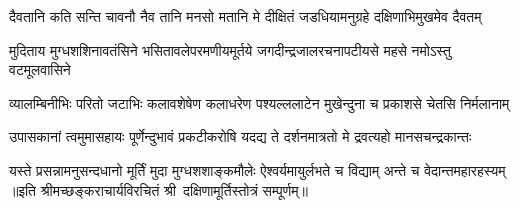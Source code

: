 \fourlineindentedshloka
{दैवतानि कति सन्ति चावनौ}
{नैव तानि मनसो मतानि मे}
{दीक्षितं जडधियामनुग्रहे}
{दक्षिणाभिमुखमेव दैवतम्}

\fourlineindentedshloka
{मुदिताय मुग्धशशिनावतंसिने}
{भसितावलेपरमणीयमूर्तये}
{जगदीन्द्रजालरचनापटीयसे}
{महसे नमोऽस्तु वटमूलवासिने}

\fourlineindentedshloka
{व्यालम्बिनीभिः परितो जटाभिः}
{कलावशेषेण कलाधरेण}
{पश्यल्ललाटेन मुखेन्दुना च}
{प्रकाशसे चेतसि निर्मलानाम्}

\fourlineindentedshloka
{उपासकानां त्वमुमासहायः}
{पूर्णेन्दुभावं प्रकटीकरोषि}
{यदद्य ते दर्शनमात्रतो मे}
{द्रवत्यहो मानसचन्द्रकान्तः}

\fourlineindentedshloka
{यस्ते प्रसन्नामनुसन्दधानो}
{मूर्तिं मुदा मुग्धशशाङ्कमौलेः}
{ऐश्वर्यमायुर्लभते च विद्याम्}
{अन्ते च वेदान्तमहारहस्यम्}
॥इति श्रीमच्छङ्कराचार्यविरचितं श्री~दक्षिणामूर्तिस्तोत्रं सम्पूर्णम्॥